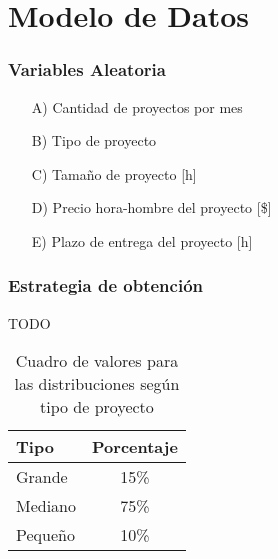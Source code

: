 \part*{Modelo de Datos}

\section{Variables Aleatoria}

\begin{itemize}
    \item[A)] Cantidad de proyectos por mes
    \item[B)] Tipo de proyecto
    \item[C)] Tamaño de proyecto [h]
    \item[D)] Precio hora-hombre del proyecto [\$]
    \item[E)] Plazo de entrega del proyecto [h]
\end{itemize}

\section{Estrategia de obtención}
TODO

\begin{table}[H]

\begin{center}

\begin{tabular}{|l|c|}
\hline
    Tipo        & Porcentaje\\
\hline
    Grande      & 15\%\\
\hline
    Mediano     & 75\%\\
\hline
    Pequeño     & 10\%\\
\hline
\end{tabular}

\end{center}

\caption{Cuadro de valores para las distribuciones según tipo de proyecto}
\label{tab:tipo-proyecto}

\end{table}

